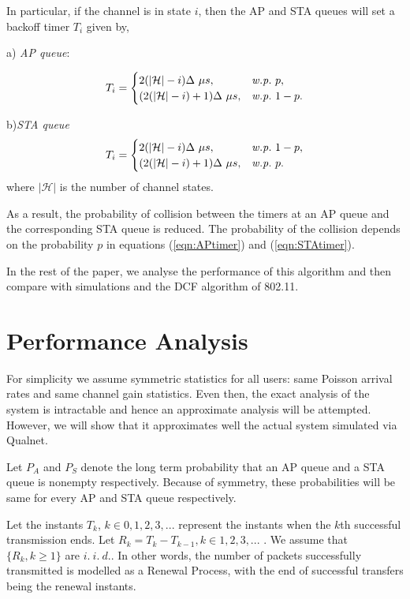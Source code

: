 \documentclass[10pt,conference]{IEEEtran}
\newcommand{\pap}{P_A}
\newcommand{\psta}{P_S}
\newcommand{\iid}{{i.~i.~d.}}
\newcommand{\wpr}{\it w.p.}
\begin{document}
 In particular, if the channel is in state $i$, then the AP and STA queues will set a backoff timer $T_i$  given by,

a) \emph{AP queue}:

\begin{equation}
T_i=
\begin{cases}
2(|\mathcal{H}|-i)\Delta  \text{  $\mu s$}, &\text{$\wpr$ $p$},\\
(2(|\mathcal{H}|-i)+1)\Delta  \text{  $\mu s$}, &\text{$\wpr$ $1-p$}.
\end{cases}
\label{eqn:APtimer}
\end{equation}

b)\emph{STA queue}
\begin{equation}
T_i=
\begin{cases}
2(|\mathcal{H}|-i)\Delta  \text{  $\mu s$}, &\text{$\wpr$ $1-p$},\\
(2(|\mathcal{H}|-i)+1)\Delta  \text{  $\mu s$}, &\text{$\wpr$ $p$}.
\end{cases}
\label{eqn:STAtimer}
\end{equation}
where $|\mathcal{H}|$ is the number of channel states. 


As a result, the probability of collision between the timers at an AP queue and the corresponding STA queue is reduced.
The probability of the collision depends on the probability $p$ in equations (\ref{eqn:APtimer}) and (\ref{eqn:STAtimer}).

In the rest of the paper, we analyse the performance of this algorithm and then compare with simulations and the DCF algorithm of 802.11.

\section{Performance Analysis}
For simplicity we assume symmetric statistics for all users: same Poisson arrival rates and same channel gain statistics.
Even then, the exact analysis of the system is intractable and hence an approximate analysis will be attempted.
However, we will show that it approximates well the actual system simulated via Qualnet.

Let $\pap$ and $\psta$ denote the long term probability that an AP queue and a STA queue is nonempty respectively. Because of symmetry, these probabilities will be same for every AP and STA queue respectively.

Let the instants $T_k$, $k \in0,1,2, 3, . . . $ represent the instants when the $k$th successful transmission ends. Let $R_k=T_k-T_{k-1}, k \in 1, 2, 3, ...$ .
We assume that $\{R_k, k \geq 1\}$ are $\iid$.
In other words, the number of packets successfully transmitted is modelled as a Renewal Process, with
the end of successful transfers being the renewal instants.
\end{document}
